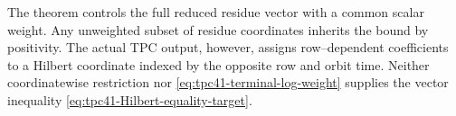 \begin{remark}
\label{rem:tpc41-weighted-boundary}
The theorem controls the full reduced residue vector with a common scalar
weight.  Any unweighted subset of residue coordinates inherits the bound
by positivity.  The actual TPC output, however, assigns row--dependent
coefficients to a Hilbert coordinate indexed by the opposite row and
orbit time.  Neither coordinatewise restriction nor
\eqref{eq:tpc41-terminal-log-weight} supplies the vector inequality
\eqref{eq:tpc41-Hilbert-equality-target}.
\end{remark}
